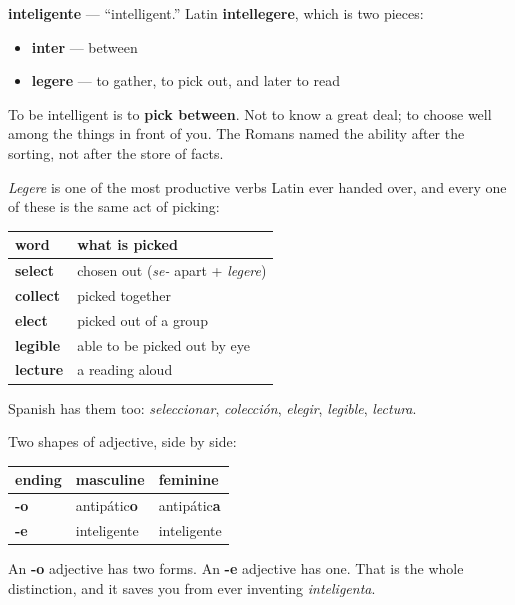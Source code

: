 \begin{cousinweb}
\textbf{inteligente} — \textquotedblleft{}intelligent.\textquotedblright{} Latin \textbf{intellegere}, which is two pieces:

\begin{itemize}
\raggedright
  \item \textbf{inter} — between
  \item \textbf{legere} — to gather, to pick out, and later to read
\end{itemize}

To be intelligent is to \textbf{pick between}. Not to know a great deal; to choose well among the things in front of you. The Romans named the ability after the sorting, not after the store of facts.

\emph{Legere} is one of the most productive verbs Latin ever handed over, and every one of these is the same act of picking:

\noindent
\begin{tabularx}{\linewidth}{@{}>{\raggedright\arraybackslash}X>{\raggedright\arraybackslash}X@{}}
\toprule
\textbf{word} & \textbf{what is picked} \\
\midrule
\textbf{select} & chosen out (\emph{se-} apart + \emph{legere}) \\
\textbf{collect} & picked together \\
\textbf{elect} & picked out of a group \\
\textbf{legible} & able to be picked out by eye \\
\textbf{lecture} & a reading aloud \\
\bottomrule
\end{tabularx}

Spanish has them too: \emph{seleccionar}, \emph{colección}, \emph{elegir}, \emph{legible}, \emph{lectura}.
\end{cousinweb}

\begin{grammarlens}[title={What you've built}]
Two shapes of adjective, side by side:

\noindent
\begin{tabularx}{\linewidth}{@{}>{\raggedright\arraybackslash}X>{\raggedright\arraybackslash}X>{\raggedright\arraybackslash}X@{}}
\toprule
\textbf{ending} & \textbf{masculine} & \textbf{feminine} \\
\midrule
\textbf{-o} & antipátic\textbf{o} & antipátic\textbf{a} \\
\textbf{-e} & inteligente & inteligente \\
\bottomrule
\end{tabularx}

An \textbf{-o} adjective has two forms. An \textbf{-e} adjective has one. That is the whole distinction, and it saves you from ever inventing \emph{inteligenta}.
\end{grammarlens}

